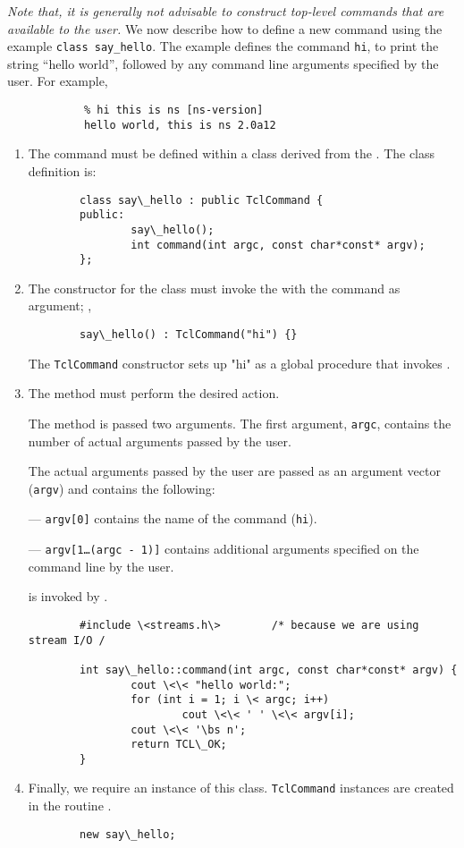 \emph{Note that, it is generally not advisable to construct
  top-level commands that are available to the user.}
We now describe how to define a new command
using the example {\tt class say\_hello}.
The example defines the command {\tt hi},
to print the string ``hello world'',
followed by any command line arguments specified by the user.
For example,
\begin{verbatim}
            % hi this is ns [ns-version]
            hello world, this is ns 2.0a12
\end{verbatim}
\begin{enumerate}
\item The command must be defined within a class
  derived from the .
  The class definition is:
  \begin{verbatim}
        class say\_hello : public TclCommand {
        public:
                say\_hello();
                int command(int argc, const char*const* argv);
        };
  \end{verbatim}
\item The constructor for the class must invoke the
  with the command as argument; \ie,
  \begin{verbatim}
        say\_hello() : TclCommand("hi") {}
  \end{verbatim}
  The {\tt TclCommand} constructor sets up "hi"
  as a global procedure that invokes
  .
\item  The method  must perform the desired action.

  The method is passed two arguments.  The first argument, {\tt argc},
  contains the number of actual arguments passed by the user.

  The actual arguments passed by the user are passed as an
  argument vector ({\tt argv}) and contains the following:
  
  --- {\tt argv[0]} contains the name of the command ({\tt hi}).

  --- {\tt argv[1\ldots(argc - 1)]} contains additional arguments
  specified on the command line by the user.

   is invoked by .
\begin{verbatim}
        #include \<streams.h\>        /* because we are using stream I/O /
        
        int say\_hello::command(int argc, const char*const* argv) {
                cout \<\< "hello world:";
                for (int i = 1; i \< argc; i++)
                        cout \<\< ' ' \<\< argv[i];
                cout \<\< '\bs n';
                return TCL\_OK;
        }
\end{verbatim}
\item Finally, we require an instance of this class.
  {\tt TclCommand} instances are created in the routine
  .
  \begin{verbatim}
        new say\_hello;
  \end{verbatim}
\end{enumerate}
